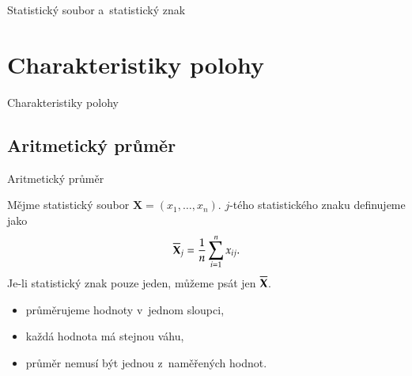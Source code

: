 \documentclass[11pt,professionalfont,aspectratio=43]{beamer}
\begin{document}
\begin{frame}{Statistický soubor a~statistický znak}


\end{frame}

\section{Charakteristiky polohy}

\begin{titleframeenv}{Charakteristiky polohy}
\end{titleframeenv}

\subsection{Aritmetický průměr}

\begin{frame}{Aritmetický průměr}

    \begin{defblock}
    Mějme statistický soubor $\mathbf{X}=(x_1,\dots,x_n)$.  $j$-tého statistického znaku definujeme jako
    \[
    \overline{\mathbf{X}}_j=\frac{1}{n}\sum_{i=1}^{n}x_{ij}.
    \]
    Je-li statistický znak pouze jeden, můžeme psát jen $\overline{\mathbf{X}}$.
    \end{defblock}

    \begin{itemize}
        \item průměrujeme hodnoty v~jednom sloupci,
        \item každá hodnota má stejnou váhu,
        \item průměr nemusí být jednou z~naměřených hodnot.
    \end{itemize}

\end{frame}
\end{document}
